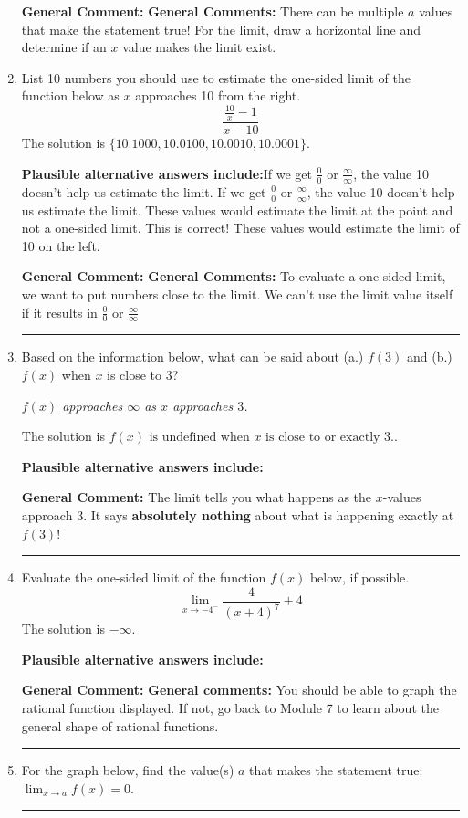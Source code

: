 \documentclass{extbook}[14pt]
\newcommand{\litem}[1]{\item #1

\rule{\textwidth}{0.4pt}}
\begin{document}
\begin{enumerate}
{\textbf{General Comment:} \textbf{General Comments:} There can be multiple $a$ values that make the statement true! For the limit, draw a horizontal line and determine if an $x$ value makes the limit exist.
}
\litem{
List 10 numbers you should use to estimate the one-sided limit of the function below as $x$ approaches 10 from the right.
\[ \frac{\frac{10}{x} - 1}{x - 10} \]The solution is \( \{ 10.1000, 10.0100, 10.0010, 10.0001 \} \).\begin{enumerate}[label=\Alph*.]
\textbf{Plausible alternative answers include:}If we get $\frac{0}{0}$ or $\frac{\infty}{\infty}$, the value 10 doesn't help us estimate the limit.
If we get $\frac{0}{0}$ or $\frac{\infty}{\infty}$, the value 10 doesn't help us estimate the limit.
These values would estimate the limit at the point and not a one-sided limit.
This is correct!
These values would estimate the limit of 10 on the left.
\end{enumerate}

\textbf{General Comment:} \textbf{General Comments:} To evaluate a one-sided limit, we want to put numbers close to the limit. We can't use the limit value itself if it results in $\frac{0}{0}$ or $\frac{\infty}{\infty}$
}
\litem{
Based on the information below, what can be said about (a.) $f(3)$ and (b.) $f(x)$ when $x$ is close to $3$?

\begin{center}
    \textit{ $f(x)$ approaches $\infty$ as $x$ approaches $3$. }
\end{center}
The solution is \( f(x) \text{ is undefined when } x \text{ is close to or exactly } 3. \).\begin{enumerate}[label=\Alph*.]
\textbf{Plausible alternative answers include:}




\end{enumerate}

\textbf{General Comment:} The limit tells you what happens as the $x$-values approach $3$. It says \textbf{absolutely nothing} about what is happening exactly at $f(3)$!
}
\litem{
Evaluate the one-sided limit of the function $f(x)$ below, if possible.
\[ \lim_{x \rightarrow -4^-} \frac{4}{(x+4)^7}+4 \]The solution is \( -\infty \).\begin{enumerate}[label=\Alph*.]
\textbf{Plausible alternative answers include:}




\end{enumerate}

\textbf{General Comment:} \textbf{General comments:} You should be able to graph the rational function displayed. If not, go back to Module 7 to learn about the general shape of rational functions.
}
\litem{
For the graph below, find the value(s) $a$ that makes the statement true: $ \displaystyle \lim_{x \rightarrow a} f(x) = 0$.

}
\end{enumerate}
\end{document}
